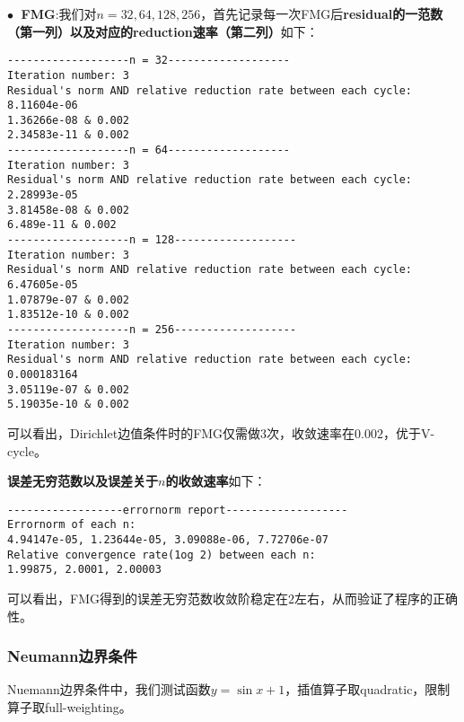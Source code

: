 \documentclass{ctexart}
\begin{document}
\begin{sloppypar}
$\bullet \;$ \textbf{FMG}:我们对$n=32,64,128,256$，首先记录每一次FMG后\textbf{residual的一范数（第一列）以及对应的reduction速率（第二列）}如下：
\begin{shaded}
\begin{verbatim}
-------------------n = 32-------------------
Iteration number: 3
Residual's norm AND relative reduction rate between each cycle: 
8.11604e-06
1.36266e-08 & 0.002
2.34583e-11 & 0.002
-------------------n = 64-------------------
Iteration number: 3
Residual's norm AND relative reduction rate between each cycle: 
2.28993e-05
3.81458e-08 & 0.002
6.489e-11 & 0.002
-------------------n = 128-------------------
Iteration number: 3
Residual's norm AND relative reduction rate between each cycle: 
6.47605e-05
1.07879e-07 & 0.002
1.83512e-10 & 0.002
-------------------n = 256-------------------
Iteration number: 3
Residual's norm AND relative reduction rate between each cycle: 
0.000183164
3.05119e-07 & 0.002
5.19035e-10 & 0.002
\end{verbatim}
\end{shaded}
可以看出，Dirichlet边值条件时的FMG仅需做$3$次，收敛速率在$0.002$，优于V-cycle。

\textbf{误差无穷范数以及误差关于$n$的收敛速率}如下：
\begin{shaded}
\begin{verbatim}
------------------errornorm report-------------------
Errornorm of each n: 
4.94147e-05, 1.23644e-05, 3.09088e-06, 7.72706e-07
Relative convergence rate(1og 2) between each n: 
1.99875, 2.0001, 2.00003
\end{verbatim} 
\end{shaded}
可以看出，FMG得到的误差无穷范数收敛阶稳定在$2$左右，从而验证了程序的正确性。

\subsubsection{Neumann边界条件}
Nuemann边界条件中，我们测试函数$y=\sin x+1$，插值算子取quadratic，限制算子取full-weighting。


\end{sloppypar}
\end{document}
